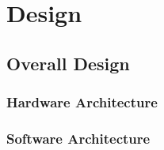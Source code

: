 \chapter{Design}
\label{chap:design}

\section{Overall Design}

\subsection{Hardware Architecture}

\subsection{Software Architecture}
